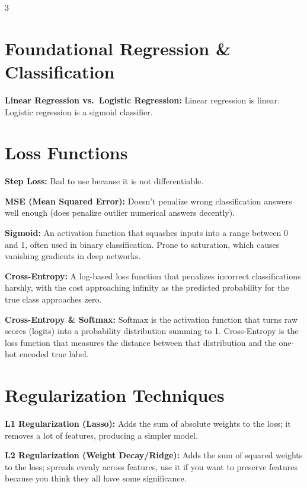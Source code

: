 \documentclass[6pt,landscape,a4paper]{extarticle}
\begin{document}
\begin{multicols}{3}

\section{Foundational Regression \& Classification}

\textbf{Linear Regression vs.\ Logistic Regression:}
Linear regression is linear. Logistic regression is a sigmoid classifier.

\section{Loss Functions}

\textbf{Step Loss:} Bad to use because it is not differentiable.

\textbf{MSE (Mean Squared Error):} Doesn't penalize wrong classification answers well enough (does penalize outlier numerical answers decently).

\textbf{Sigmoid:} An activation function that squashes inputs into a range between 0 and 1, often used in binary classification. Prone to saturation, which causes vanishing gradients in deep networks.

\textbf{Cross-Entropy:} A log-based loss function that penalizes incorrect classifications harshly, with the cost approaching infinity as the predicted probability for the true class approaches zero.

\textbf{Cross-Entropy \& Softmax:} Softmax is the activation function that turns raw scores (logits) into a probability distribution summing to 1. Cross-Entropy is the loss function that measures the distance between that distribution and the one-hot encoded true label.

\section{Regularization Techniques}

\textbf{L1 Regularization (Lasso):} Adds the sum of absolute weights to the loss; it removes a lot of features, producing a simpler model.

\textbf{L2 Regularization (Weight Decay/Ridge):} Adds the sum of squared weights to the loss; spreads evenly across features, use it if you want to preserve features because you think they all have some significance.


\end{multicols}
\end{document}
